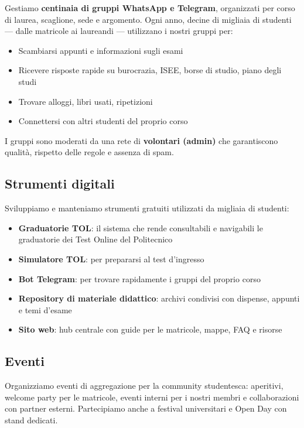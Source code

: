 \documentclass[11pt,a4paper]{article}
\begin{document}
Gestiamo \textbf{centinaia di gruppi WhatsApp e Telegram}, organizzati
per corso di laurea, scaglione, sede e argomento. Ogni anno, decine di
migliaia di studenti — dalle matricole ai laureandi — utilizzano i
nostri gruppi per:

\begin{itemize}[leftmargin=2em]
    \item Scambiarsi appunti e informazioni sugli esami
    \item Ricevere risposte rapide su burocrazia, ISEE, borse di studio, piano degli studi
    \item Trovare alloggi, libri usati, ripetizioni
    \item Connettersi con altri studenti del proprio corso
\end{itemize}

I gruppi sono moderati da una rete di \textbf{volontari (admin)} che
garantiscono qualità, rispetto delle regole e assenza di spam.

\subsection{Strumenti digitali}

Sviluppiamo e manteniamo strumenti gratuiti utilizzati da migliaia
di studenti:

\begin{itemize}[leftmargin=2em]
    \item \textbf{Graduatorie TOL}: il sistema che rende consultabili
          e navigabili le graduatorie dei Test Online del Politecnico
    \item \textbf{Simulatore TOL}: per prepararsi al test d'ingresso
    \item \textbf{Bot Telegram}: per trovare rapidamente i gruppi del
          proprio corso
    \item \textbf{Repository di materiale didattico}: archivi condivisi
          con dispense, appunti e temi d'esame
    \item \textbf{Sito web}: hub centrale con guide per le matricole,
          mappe, FAQ e risorse
\end{itemize}

\subsection{Eventi}

Organizziamo eventi di aggregazione per la community studentesca:
aperitivi, welcome party per le matricole, eventi interni per i
nostri membri e collaborazioni con partner esterni. Partecipiamo
anche a festival universitari e Open Day con stand dedicati.
\end{document}
